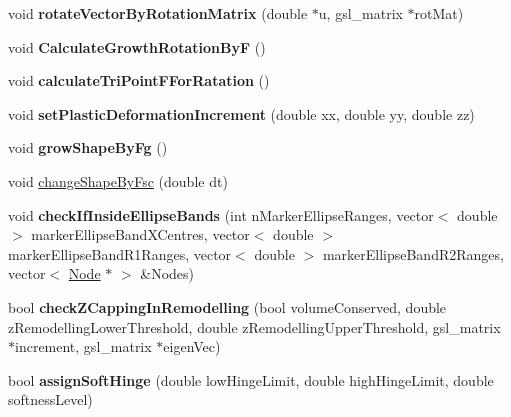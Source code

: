 \begin{DoxyCompactItemize}
\item 
\hypertarget{classShapeBase_a14a573072213ea91314c8f1101f106bb}{}void {\bfseries rotate\+Vector\+By\+Rotation\+Matrix} (double $\ast$u, gsl\+\_\+matrix $\ast$rot\+Mat)\label{classShapeBase_a14a573072213ea91314c8f1101f106bb}

\item 
\hypertarget{classShapeBase_a9ae4c5fc8817528493502e3f75c9a984}{}void {\bfseries Calculate\+Growth\+Rotation\+By\+F} ()\label{classShapeBase_a9ae4c5fc8817528493502e3f75c9a984}

\item 
\hypertarget{classShapeBase_a5f5e95f38f271d28f2856109b0256aa0}{}void {\bfseries calculate\+Tri\+Point\+F\+For\+Ratation} ()\label{classShapeBase_a5f5e95f38f271d28f2856109b0256aa0}

\item 
\hypertarget{classShapeBase_aa36cea09cbf418a9e37454016c5b3f30}{}void {\bfseries set\+Plastic\+Deformation\+Increment} (double xx, double yy, double zz)\label{classShapeBase_aa36cea09cbf418a9e37454016c5b3f30}

\item 
\hypertarget{classShapeBase_a29ee0eeca30fdd381d294b383c3baf0c}{}void {\bfseries grow\+Shape\+By\+Fg} ()\label{classShapeBase_a29ee0eeca30fdd381d294b383c3baf0c}

\item 
void \hyperlink{classShapeBase_a5409de18ee9e47af0bb977f4a1e608fb}{change\+Shape\+By\+Fsc} (double dt)
\item 
\hypertarget{classShapeBase_aaed6b74cc2bdab11f7691ef3d99c3e32}{}void {\bfseries check\+If\+Inside\+Ellipse\+Bands} (int n\+Marker\+Ellipse\+Ranges, vector$<$ double $>$ marker\+Ellipse\+Band\+X\+Centres, vector$<$ double $>$ marker\+Ellipse\+Band\+R1\+Ranges, vector$<$ double $>$ marker\+Ellipse\+Band\+R2\+Ranges, vector$<$ \hyperlink{classNode}{Node} $\ast$ $>$ \&Nodes)\label{classShapeBase_aaed6b74cc2bdab11f7691ef3d99c3e32}

\item 
\hypertarget{classShapeBase_a2e7fdc8e749b8b709b6c80248dc2bc3f}{}bool {\bfseries check\+Z\+Capping\+In\+Remodelling} (bool volume\+Conserved, double z\+Remodelling\+Lower\+Threshold, double z\+Remodelling\+Upper\+Threshold, gsl\+\_\+matrix $\ast$increment, gsl\+\_\+matrix $\ast$eigen\+Vec)\label{classShapeBase_a2e7fdc8e749b8b709b6c80248dc2bc3f}

\item 
\hypertarget{classShapeBase_ab533629d46c9c4c61d51ca74b3f8cd63}{}bool {\bfseries assign\+Soft\+Hinge} (double low\+Hinge\+Limit, double high\+Hinge\+Limit, double softness\+Level)\label{classShapeBase_ab533629d46c9c4c61d51ca74b3f8cd63}


\end{DoxyCompactItemize}

